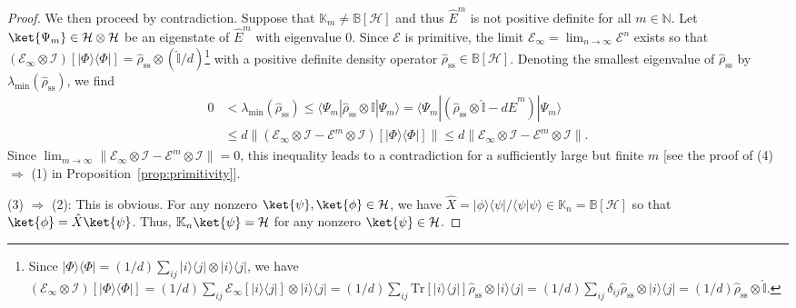 \documentclass[preprint,pteplogo]{ptephy_v2}%
\numberwithin{equation}{section}
\theoremstyle{definition}
\newcommand{\mc}[1]{\mathcal{#1}}
\newcommand{\mr}[1]{\mathrm{#1}}
\newcommand{\mbb}[1]{\mathbb{#1}}
\newcommand{\Tr}{\mr{Tr}}
\begin{document}
\begin{proof}
We then proceed by contradiction. 
Suppose that $\mbb{K}_m \neq \mbb{B}[\mc{H}]$ and thus $\hat{E}^m$ is not positive definite for all $m \in \mbb{N}$.
Let $\ket{\Psi_m} \in \mc{H} \otimes \mc{H}$ be an eigenstate of $\hat{E}^m$ with eigenvalue $0$.
Since $\mc{E}$ is primitive, the limit $\mc{E}_\infty = \lim_{n \to \infty} \mc{E}^n$ exists so that $(\mc{E}_\infty \otimes \mc{I})[| \Phi \rangle \langle \Phi |] = \hat{\rho}_\mathrm{ss} \otimes (\hat{\mbb{I}}/d)$\footnote{
Since $| \Phi \rangle \langle \Phi | = (1/d) \sum_{ij} |i \rangle \langle j | \otimes |i \rangle \langle j |$, we have $(\mc{E}_\infty \otimes \mc{I})[| \Phi \rangle \langle \Phi |] 
= (1/d) \sum_{ij} \mc{E}_\infty[| i \rangle \langle j |] \otimes | i \rangle \langle j |
= (1/d) \sum_{ij} \Tr[| i \rangle \langle j |] \hat{\rho}_\mathrm{ss} \otimes | i \rangle \langle j | 
= (1/d) \sum_{ij} \delta_{ij} \hat{\rho}_\mathrm{ss} \otimes | i \rangle \langle j |
= (1/d) \hat{\rho}_\mathrm{ss} \otimes \hat{\mbb{I}}$.
} with a positive definite density operator $\hat{\rho}_\mathrm{ss} \in \mbb{B}[\mc{H}]$.
Denoting the smallest eigenvalue of $\hat{\rho}_\mathrm{ss}$ by $\lambda_\textrm{min}(\hat{\rho}_\mathrm{ss})$, we find
\begin{align}
0 
&< \lambda_\textrm{min}(\hat{\rho}_\mathrm{ss})
\leq \langle \Psi_m | \hat{\rho}_\mathrm{ss} \otimes \mbb{I} | \Psi_m \rangle 
= \langle \Psi_m | (\hat{\rho}_\mathrm{ss} \otimes \hat{\mbb{I}} - d \hat{E}^m) | \Psi_m \rangle \nonumber \\
&\leq d \| (\mc{E}_\infty \otimes \mc{I} - \mc{E}^m \otimes \mc{I}) [| \Phi \rangle \langle \Phi |] \|
\leq d \| \mc{E}_\infty \otimes \mc{I} - \mc{E}^m \otimes \mc{I} \|.
\end{align}
Since $\lim_{m \to \infty} \| \mc{E}_\infty \otimes \mc{I} - \mc{E}^m \otimes \mc{I} \| = 0$, this inequality leads to a contradiction for a sufficiently large but finite $m$ [see the proof of (4) $\Rightarrow$ (1) in Proposition~\ref{prop:primitivity}].

(3) $\Rightarrow$ (2): This is obvious.
For any nonzero $\ket{\psi}, \ket{\phi} \in \mc{H}$, we have $\hat{X} = |\phi \rangle \langle \psi | / \langle \psi | \psi \rangle \in \mbb{K}_n = \mbb{B}[\mc{H}]$ so that $\ket{\phi} = \hat{X} \ket{\psi}$.
Thus, $\mbb{K}_n \ket{\psi} = \mc{H}$ for any nonzero $\ket{\psi} \in \mc{H}$.
\end{proof}
\end{document}
